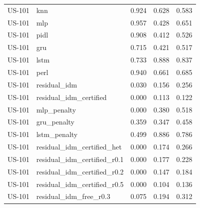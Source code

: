 \begin{table}[htbp]
\begin{tabular}{llrrr}
US-101 & knn & 0.924 & 0.628 & 0.583 \\
US-101 & mlp & 0.957 & 0.428 & 0.651 \\
US-101 & pidl & 0.908 & 0.412 & 0.526 \\
US-101 & gru & 0.715 & 0.421 & 0.517 \\
US-101 & lstm & 0.733 & 0.888 & 0.837 \\
US-101 & perl & 0.940 & 0.661 & 0.685 \\
US-101 & residual\_idm & 0.030 & 0.156 & 0.256 \\
US-101 & residual\_idm\_certified & 0.000 & 0.113 & 0.122 \\
US-101 & mlp\_penalty & 0.000 & 0.380 & 0.518 \\
US-101 & gru\_penalty & 0.359 & 0.347 & 0.458 \\
US-101 & lstm\_penalty & 0.499 & 0.886 & 0.786 \\
US-101 & residual\_idm\_certified\_het & 0.000 & 0.174 & 0.266 \\
US-101 & residual\_idm\_certified\_r0.1 & 0.000 & 0.177 & 0.228 \\
US-101 & residual\_idm\_certified\_r0.2 & 0.000 & 0.147 & 0.184 \\
US-101 & residual\_idm\_certified\_r0.5 & 0.000 & 0.104 & 0.136 \\
US-101 & residual\_idm\_free\_r0.3 & 0.075 & 0.194 & 0.312 \\
\bottomrule
\end{tabular}
\end{table}
